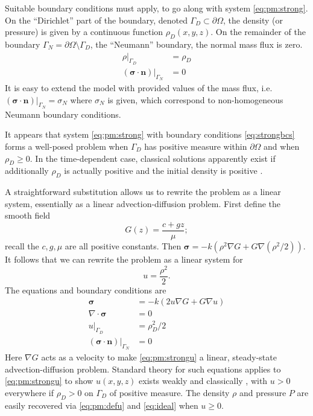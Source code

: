 \documentclass[11pt]{amsart}
\newcommand{\bn}{\mathbf{n}}
\newcommand{\bsigma}{\bm{\sigma}}
\newcommand{\Div}{\nabla\cdot}
\newcommand{\grad}{\nabla}
\begin{document}
Suitable boundary conditions must apply, to go along with system \eqref{eq:pm:strong}.  On the ``Dirichlet'' part of the boundary, denoted $\Gamma_D \subset \partial\Omega$, the density (or pressure) is given by a continuous function $\rho_D(x,y,z)$.  On the remainder of the boundary $\Gamma_N = \partial\Omega \setminus \Gamma_D$, the ``Neumann'' boundary, the normal mass flux is zero. 
\begin{subequations}
\label{eq:strongbcs}
\begin{align}
\rho|_{\Gamma_D}               &= \rho_D \\
(\bsigma\cdot \bn)|_{\Gamma_N} &= 0
\end{align}
\end{subequations}
It is easy to extend the model with provided values of the mass flux, i.e.~$(\bsigma\cdot \bn)|_{\Gamma_N}= \sigma_N$ where $\sigma_N$ is given, which correspond to non-homogeneous Neumann boundary conditions.

It appears that system \eqref{eq:pm:strong} with boundary conditions \eqref{eq:strongbcs} forms a well-posed problem when $\Gamma_D$ has positive measure within $\partial\Omega$ and when $\rho_D\ge 0$.  In the time-dependent case, classical solutions apparently exist if additionally $\rho_D$ is actually positive and the initial density is positive \citep[Theorem 3.1]{Vazquez2007}.

A straightforward substitution allows us to rewrite the problem as a linear system, essentially as a linear advection-diffusion problem.  First define the smooth field
\begin{equation}
G(z) = \frac{c + g z}{\mu};
\end{equation}
recall the $c,g,\mu$ are all positive constants.  Then $\bsigma = -k \left(\rho^2 \grad G + G \grad(\rho^2/2)\right)$.  It follows that we can rewrite the problem as a linear system for
\begin{equation}
u = \frac{\rho^2}{2}. \label{eq:pm:defu}
\end{equation}
The equations and boundary conditions are
\begin{subequations}
\label{eq:pm:strongu}
\begin{align}
\bsigma &= - k \left(2 u \grad G + G \grad u\right) \\
\Div \bsigma &= 0 \\
u|_{\Gamma_D} &= \rho_D^2/2 \\
(\bsigma\cdot \bn)|_{\Gamma_N} &= 0
\end{align}
\end{subequations}
Here $\grad G$ acts as a velocity to make \eqref{eq:pm:strongu} a linear, steady-state advection-diffusion problem.  Standard theory for such equations applies to \eqref{eq:pm:strongu} to show $u(x,y,z)$ exists weakly and classically \citep[Chapter 6]{Evans2010}, with $u>0$ everywhere if $\rho_D>0$ on $\Gamma_D$ of positive measure.  The density $\rho$ and pressure $P$ are easily recovered via \eqref{eq:pm:defu} and \eqref{eq:ideal} when $u\ge 0$.
\end{document}
